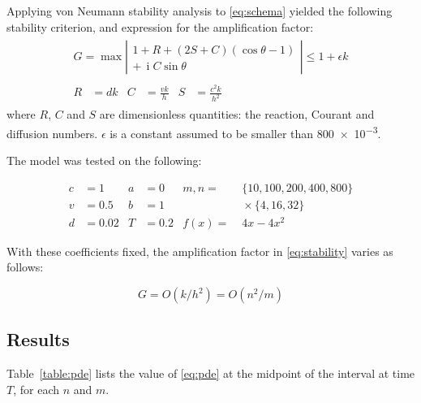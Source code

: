\documentclass[a4paper,12pt,twocolumn]{article}
\begin{document}
Applying von Neumann stability analysis to \eqref{eq:schema} yielded the 
following stability criterion, and expression for the amplification factor:
{\footnotesize
    \begin{gather}
        \label{eq:stability}
        \begin{split}
            G = \operatorname{max}\left| 
            \begin{array}{r}
                1 + R + (2S + C)(\cos\theta - 1)\\
                +\,\operatorname{i}C\sin\theta
            \end{array}
            \right| \leq 1 + \epsilon k
        \end{split} \\
        \nonumber
        \begin{aligned}
            R &= dk & C &= \frac{vk}{h} & S &= \frac{c^2k}{h^2}
        \end{aligned}
    \end{gather}
}where $R$, $C$ and $S$ are dimensionless quantities: the reaction, Courant and 
diffusion numbers. $\epsilon$ is a constant assumed to be smaller than 
\num{800e-3}.

The model was tested on the following:
{\footnotesize
    \begin{align*}
        c &= 1    & a &= 0   & m,n  =&\;\{10,100,200,400,800\} \\
        v &= 0.5  & b &= 1   &       &\;\times \{4,16,32\} \\
        d &= 0.02 & T &= 0.2 & f(x) =&\;4x - 4x^2
    \end{align*}

}With these coefficients fixed, the amplification factor in \eqref{eq:stability}
varies as follows:
{\footnotesize
    \begin{equation} \label{eq:gain}
        G = O(k/h^2) = O(n^2/m)
    \end{equation}

}\subsection{Results}

Table~\ref{table:pde} lists the value of \eqref{eq:pde} at the midpoint of the 
interval at time $T$, for each $n$ and $m$.
\end{document}
